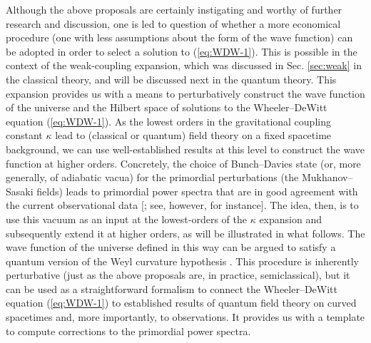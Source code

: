 \documentclass[12pt]{iopart}
\def\eref#1{(\ref{eq:#1})}
\begin{document}
Although the above proposals are certainly instigating and worthy of further research and discussion, one is led to question of whether a more economical procedure (one with less assumptions about the form of the wave function) can be adopted in order to select a solution to \eref{WDW-1}. This is possible in the context of the weak-coupling expansion, which was discussed in Sec. \ref{sec:weak} in the classical theory, and will be discussed next in the quantum theory. This expansion provides us with a means to perturbatively construct the wave function of the universe and the Hilbert space of solutions to the Wheeler--DeWitt equation \eref{WDW-1}. As the lowest orders in the gravitational coupling constant $\kappa$ lead to (classical or quantum) field theory on a fixed spacetime background, we can use well-established results at this level to construct the wave function at higher orders. Concretely, the choice of Bunch--Davies state (or, more generally, of adiabatic vacua) for the primordial perturbations (the Mukhanov--Sasaki fields) leads to primordial power spectra that are in good agreement with the current observational data [\citet{Planck2019}; see, however, \citet{Baunach_2021} for instance]. The idea, then, is to use this vacuum as an input at the lowest-orders of the $\kappa$ expansion and subsequently extend it at higher orders, as will be illustrated in what follows. The wave function of the universe defined in this way can be argued to satisfy a quantum version of the Weyl curvature hypothesis \citep{Kiefer:2021zqz}. This procedure is inherently perturbative (just as the above proposals are, in practice, semiclassical), but it can be used as a straightforward formalism to connect the Wheeler--DeWitt equation \eref{WDW-1} to established results of quantum field theory on curved spacetimes and, more importantly, to observations. It provides us with a template to compute corrections to the primordial power spectra.
\end{document}
